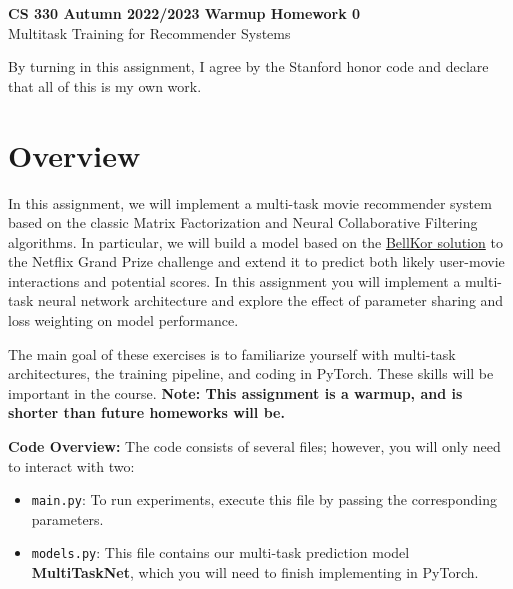 \documentclass[12pt]{article}
\begin{document}
\begin{center}
{\Large \textbf{CS 330 Autumn 2022/2023 Warmup Homework 0} \\ Multitask Training for Recommender Systems}

\end{center}

By turning in this assignment, I agree by the Stanford honor code and declare
that all of this is my own work.



\section{Overview}
In this assignment, we will implement a multi-task movie recommender system based on the classic Matrix Factorization \cite{Yehuda2009matrix} and Neural Collaborative Filtering ~\cite{he2017neural} algorithms. In particular, we will build a model based on the \href{https://www2.seas.gwu.edu/~simhaweb/champalg/cf/papers/KorenBellKor2009.pdf}{BellKor solution} to the Netflix Grand Prize challenge and extend it to predict both likely user-movie interactions and potential scores. In this assignment you will implement a multi-task neural network architecture and explore the effect of parameter sharing and loss weighting on model performance.

\vspace{0.2cm}
\noindent The main goal of these exercises is to familiarize yourself with multi-task architectures, the training pipeline, and coding in PyTorch. These skills will be important in the course. \textbf{Note: This assignment is a warmup, and is shorter than future homeworks will be.}

\vspace{0.2cm}

\noindent\textbf{Code Overview:} The code consists of several files; however, you will only need to interact with two:

\begin{itemize}
    \item \texttt{main.py}: To run experiments, execute this file by passing the corresponding parameters. 
    \item \texttt{models.py}: This file contains our multi-task prediction model \textbf{MultiTaskNet}, which you will need to finish implementing in PyTorch.
\end{itemize}
\end{document}

